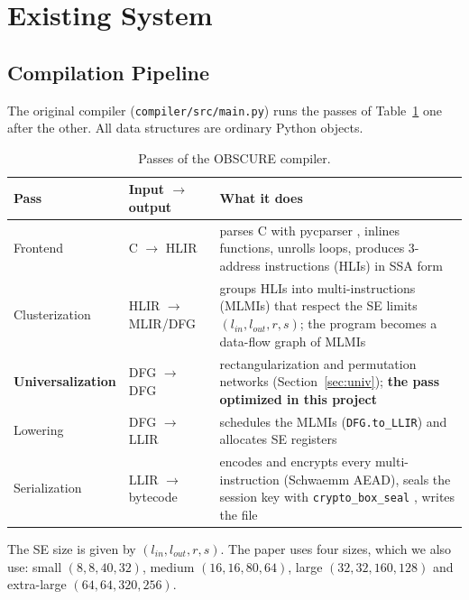 \documentclass[12pt,a4paper,oneside]{report}
\newcommand{\code}[1]{\texttt{#1}}
\begin{document}
\section{Existing System}
\subsection{Compilation Pipeline}
The original compiler (\code{compiler/src/main.py}) runs the passes of
Table~\ref{tab:pipeline} one after the other. All data structures are ordinary Python objects.

\begin{table}[H]
\centering\small
\caption{Passes of the OBSCURE compiler.}
\label{tab:pipeline}
\begin{tabularx}{\textwidth}{@{}l l X@{}}
\toprule
Pass & Input $\rightarrow$ output & What it does\\ \midrule
Frontend & C $\rightarrow$ HLIR & parses C with pycparser \cite{pycparser}, inlines functions, unrolls loops, produces 3-address instructions (HLIs) in SSA form\\
Clusterization & HLIR $\rightarrow$ MLIR/DFG & groups HLIs into multi-instructions (MLMIs) that respect the SE limits $(l_{in}, l_{out}, r, s)$; the program becomes a data-flow graph of MLMIs\\
\textbf{Universalization} & DFG $\rightarrow$ DFG & rectangularization and permutation networks (Section~\ref{sec:univ}); \textbf{the pass optimized in this project}\\
Lowering & DFG $\rightarrow$ LLIR & schedules the MLMIs (\code{DFG.to\_LLIR}) and allocates SE registers\\
Serialization & LLIR $\rightarrow$ bytecode & encodes and encrypts every multi-instruction (Schwaemm AEAD), seals the session key with \code{crypto\_box\_seal} \cite{libsodium}, writes the file\\
\bottomrule
\end{tabularx}
\end{table}

The SE size is given by $(l_{in}, l_{out}, r, s)$. The paper uses four sizes, which we also use:
small $(8,8,40,32)$, medium $(16,16,80,64)$, large $(32,32,160,128)$ and extra-large
$(64,64,320,256)$.
\end{document}
